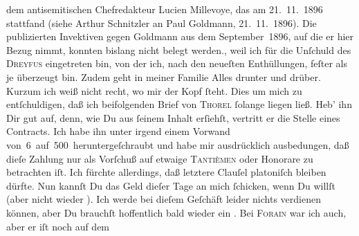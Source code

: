 \begin{ledgroupsized}[t]{13cm}
{{{                  dem antisemitischen Chefredakteur Lucien
                     Millevoye, das am 21. 11. 1896 stattfand (siehe Arthur Schnitzler an Paul Goldmann, 21. 11. 1896). Die publizierten
                  Invektiven gegen Goldmann aus dem September 1896, auf die er hier Bezug nimmt, konnten
                  bislang nicht belegt werden.}}}\label{K_L02785-1h}, weil ich \strikeout{\textcolor{gray}{von}} für die Unſchuld des \textsc{Dreyfus} eingetreten bin, von der ich, nach den neueſten Enthüllungen, feſter als je
               überzeugt bin. Zudem geht in meiner Familie Alles drunter und drüber. Kurzum ich weiß
               nicht recht, wo mir {\pb}der Kopf ſteht.\pend
           \pstart
           Dies um mich zu entſchuldigen, daß ich  beifolgenden
               Brief von \textsc{Thorel} ſolange liegen ließ. Heb’ ihn Dir gut auf, denn, wie Du aus ſeinem Inhalt
               erſiehſt, vertritt er die Stelle eines Contracts. Ich habe ihn unter irgend einem
               Vorwand von 6 auf 500 heruntergeſchraubt und habe mir ausdrücklich ausbedungen, daß
               dieſe Zahlung nur als Vorſchuß auf etwaige {\pb}\strikeout{\textcolor{gray}{×}}{ }\textsc{Tantièmen} oder Honorare zu betrachten iſt. Ich fürchte
               allerdings, daß letztere Clauſel platoniſch bleiben dürfte. Nun kannſt Du das Geld
               dieſer Tage an mich ſchicken, wenn Du willſt (aber nicht wieder \label{K_L02785-2v}\label{K_L02785-2h}). Ich werde bei dieſem Geſchäft leider nichts verdienen können, aber Du
               brauchſt hoffentlich bald wieder ein \label{K_L02785-3v}\label{K_L02785-3h}.\pend
           \pstart
           Bei \textsc{Forain} war ich auch, aber er iſt noch auf {\pb}dem

\end{ledgroupsized}
